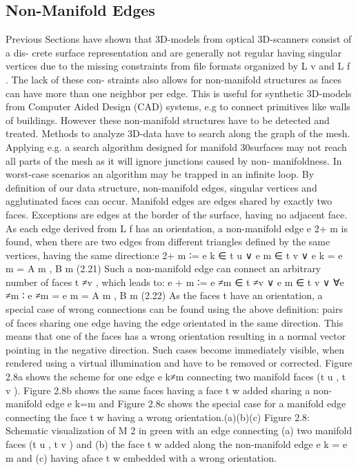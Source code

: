 \documentclass[openany]{book}
\begin{document}
\subsection{Non-Manifold Edges}
Previous Sections have shown that 3D-models from optical 3D-scanners consist of a dis-
crete surface representation and are generally not regular having singular vertices due to
the missing constraints from file formats organized by L v and L f . The lack of these con-
straints also allows for non-manifold structures as faces can have more than one neighbor
per edge. This is useful for synthetic 3D-models from Computer Aided Design (CAD)
systems, e.g to connect primitives like walls of buildings. However these non-manifold
structures have to be detected and treated. Methods to analyze 3D-data have to search
along the graph of the mesh. Applying e.g. a search algorithm designed for manifold
30surfaces may not reach all parts of the mesh as it will ignore junctions caused by non-
manifoldness. In worst-case scenarios an algorithm may be trapped in an infinite loop. By
definition of our data structure, non-manifold edges, singular vertices and agglutinated
faces can occur.
Manifold edges are edges shared by exactly two faces. Exceptions are edges at the
border of the surface, having no adjacent face. As each edge derived from L f has an
orientation, a non-manifold edge e 2+
m is found, when there are two edges from different
triangles defined by the same vertices, having the same direction:e 2+
m ∶= e k ∈ t u ∨ e m ∈ t v ∨ e k = e m = {A m , B m }(2.21)
Such a non-manifold edge can connect an arbitrary number of faces t ≠v , which leads to:
e + m ∶= e ≠m ∈ t ≠v ∨ e m ∈ t v ∨ ∀e ≠m ∶ e ≠m = e m = {A m , B m }(2.22)
As the faces t have an orientation, a special case of wrong connections can be found
using the above definition: pairs of faces sharing one edge having the edge orientated in
the same direction. This means that one of the faces has a wrong orientation resulting
in a normal vector pointing in the negative direction. Such cases become immediately
visible, when rendered using a virtual illumination and have to be removed or corrected.
Figure 2.8a shows the scheme for one edge e k≠m connecting two manifold faces (t u , t v ).
Figure 2.8b shows the same faces having a face t w added sharing a non-manifold edge
e k=m and Figure 2.8c shows the special case for a manifold edge connecting the face t w
having a wrong orientation.(a)(b)(c)
Figure 2.8: Schematic visualization of M 2 in green with an edge connecting (a) two manifold
faces (t u , t v ) and (b) the face t w added along the non-manifold edge e k = e m and 
(c) having aface t w embedded with a wrong orientation.~\cite[p.~30-31]{Mara12}
\end{document}
